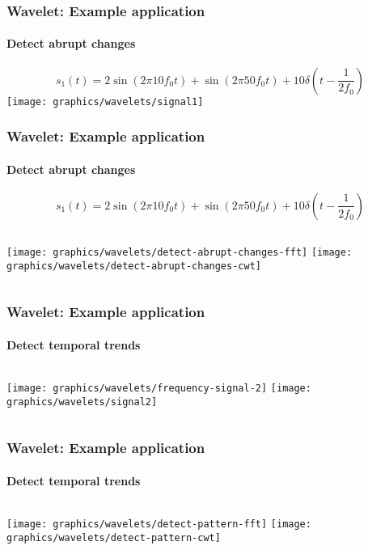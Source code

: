     \begin{frame}
        \frametitle{Wavelet: Example application}
        \framesubtitle{Detect abrupt changes}

        \centering
        \vskip -1cm
        $$s_1(t) = 2\sin\left(2\pi 10f_0 t\right) + \sin\left(2\pi 50f_0 t\right) + 10\delta\left(t - \frac{1}{2f_0}\right)$$
        \texttt{[image: graphics/wavelets/signal1]}

    \end{frame}

    \begin{frame}
        \frametitle{Wavelet: Example application}
        \framesubtitle{Detect abrupt changes}
        $$s_1(t) = 2\sin\left(2\pi 10f_0 t\right) + \sin\left(2\pi 50f_0 t\right) + 10\delta\left(t - \frac{1}{2f_0}\right)$$
        \begin{columns}[onlytextwidth]
            \texttt{[image: graphics/wavelets/detect-abrupt-changes-fft]}
            \texttt{[image: graphics/wavelets/detect-abrupt-changes-cwt]}
        \end{columns}
        
    \end{frame}

    \begin{frame}
        \frametitle{Wavelet: Example application}
        \framesubtitle{Detect temporal trends}

        \begin{columns}[onlytextwidth]
            \texttt{[image: graphics/wavelets/frequency-signal-2]}
            \texttt{[image: graphics/wavelets/signal2]}
        \end{columns}
        
    \end{frame}
    
    \begin{frame}
        \frametitle{Wavelet: Example application}
        \framesubtitle{Detect temporal trends}

        \begin{columns}[onlytextwidth]
            \texttt{[image: graphics/wavelets/detect-pattern-fft]}
            \texttt{[image: graphics/wavelets/detect-pattern-cwt]}
        \end{columns}
        
    \end{frame}

